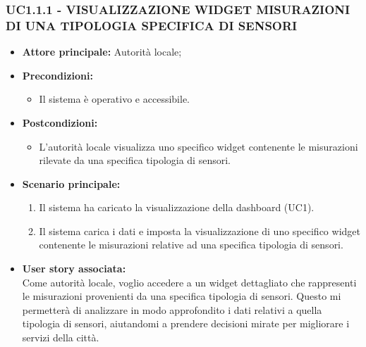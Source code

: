 \subsubsection{UC1.1.1 - VISUALIZZAZIONE WIDGET MISURAZIONI DI UNA TIPOLOGIA SPECIFICA DI SENSORI}

\begin{itemize}
    \item \textbf{Attore principale:} Autorità locale;
    \item \textbf{Precondizioni:}
        \begin{itemize}
            \item Il sistema è operativo e accessibile.
        \end{itemize}
    \item \textbf{Postcondizioni:}
        \begin{itemize}
            \item L'autorità locale visualizza uno specifico widget contenente le misurazioni rilevate da una specifica tipologia di sensori.
        \end{itemize}
    \item \textbf{Scenario principale:}
        \begin{enumerate}
            \item Il sistema ha caricato la visualizzazione della dashboard (UC1).
            \item Il sistema carica i dati e imposta la visualizzazione di uno specifico widget contenente le misurazioni relative ad una specifica tipologia di sensori.
        \end{enumerate}
    \item \textbf{User story associata:} \\
        Come autorità locale, voglio accedere a un widget dettagliato che rappresenti le misurazioni provenienti da una specifica tipologia di sensori. Questo mi permetterà di analizzare in modo approfondito i dati relativi a quella tipologia di sensori, aiutandomi a prendere decisioni mirate per migliorare i servizi della città.
\end{itemize}